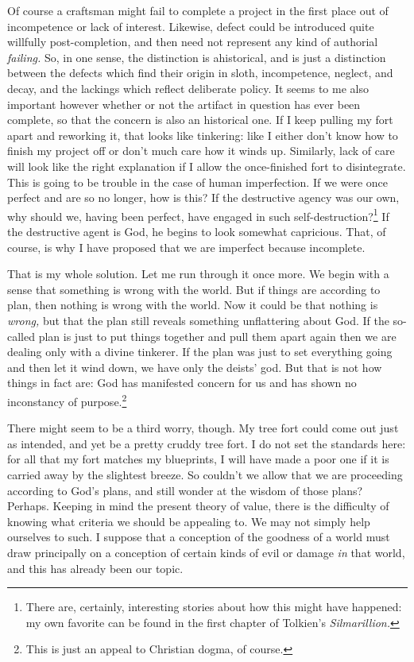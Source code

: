 \documentclass[11pt]{amsart}
\begin{document}
Of course a craftsman might fail to complete a project in the first place out of incompetence or lack of interest. Likewise, defect could be introduced quite willfully post-completion, and then need not represent any kind of authorial \emph{failing.} So, in one sense, the distinction is ahistorical, and is just a distinction between the defects which find their origin in sloth, incompetence, neglect, and decay, and the lackings which reflect deliberate policy. It seems to me also important however whether or not the artifact in question has ever been complete, so that the concern is also an historical one. If I keep pulling my fort apart and reworking it, that looks like tinkering: like I either don't know how to finish my project off or don't much care how it winds up. Similarly, lack of care will look like the right explanation if I allow the once-finished fort to disintegrate. This is going to be trouble in the case of human imperfection. If we were once perfect and are so no longer, how is this? If the destructive agency was our own, why should we, having been perfect, have engaged in such self-destruction?\footnote{There are, certainly, interesting stories about how this might have happened: my own favorite can be found in the first chapter of Tolkien's \emph{Silmarillion.}} If the destructive agent is God, he begins to look somewhat capricious. That, of course, is why I have proposed that we are imperfect because incomplete.

That is my whole solution. Let me run through it once more. We begin with a sense that something is wrong with the world. But if things are according to plan, then nothing is wrong with the world. Now it could be that nothing is \emph{wrong,} but that the plan still reveals something unflattering about God. If the so-called plan is just to put things together and pull them apart again then we are dealing only with a divine tinkerer. If the plan was just to set everything going and then let it wind down, we have only the deists' god. But that is not how things in fact are: God has manifested concern for us and has shown no inconstancy of purpose.\footnote{This is just an appeal to Christian dogma, of course.}

There might seem to be a third worry, though. My tree fort could come out just as intended, and yet be a pretty cruddy tree fort. I do not set the standards here: for all that my fort matches my blueprints, I will have made a poor one if it is carried away by the slightest breeze. So couldn't we allow that we are proceeding according to God's plans, and still wonder at the wisdom of those plans? Perhaps. Keeping in mind the present theory of value, there is the difficulty of knowing what criteria we should be appealing to. We may not simply help ourselves to such. I suppose that a conception of the goodness of a world must draw principally on a conception of certain kinds of evil or damage \emph{in} that world, and this has already been our topic.
\end{document}
